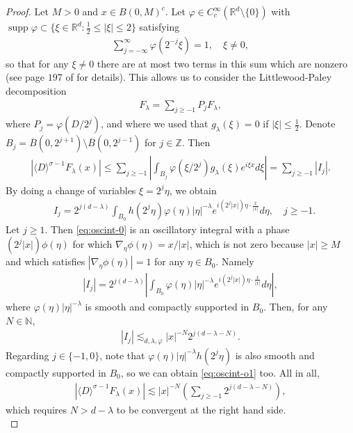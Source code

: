 \documentclass[a4paper, reqno, 11pt]{amsart}
\theoremstyle{definition}
\DeclareMathOperator\supp{supp}
\begin{document}
\begin{proof}
Let $M > 0$ and $x \in B(0,M)^c$. Let $\varphi \in C^{\infty}_c(\mathbb{R}^d\setminus \{0\})$ with $\supp \varphi \subset \{\xi \in \mathbb{R}^d : \frac{1}{2} \leq |\xi| \leq 2\}$ satisfying
\begin{align*}
\sum_{j = -\infty}^{\infty} \varphi(2^{-j}\xi) = 1, \quad \xi \neq 0,
\end{align*}
so that for any $\xi \neq 0$ there are at most two terms in this sum which are nonzero (see page $197$ of \cite{MS1} for details). This allows us to consider the Littlewood-Paley decomposition
\begin{align}
			F_{\lambda} = \sum_{j \geq -1} P_{j}F_{\lambda},
			\label{eq:lp-decomp}
		\end{align}
		where $P_j = \varphi(D/2^j)$, and where we used that $g_{\lambda}(\xi) = 0$ if $|\xi| \leq \frac{1}{2}$. Denote $B_j = \overline{B}(0,2^{j+1}) \setminus \overline{B}(0,2^{j-1})$ for $j \in \mathbb{Z}$. Then
\begin{align*}
|\langle D \rangle^{\sigma-1} F_{\lambda}(x)| \leq \sum_{j \geq -1} \left| \int_{B_j} \varphi(\xi/2^j) g_{\lambda}(\xi) e^{i\xi x} d\xi \right| = \sum_{j\geq -1} |I_j|.
\end{align*}
By doing a change of variables $\xi = 2^j \eta$, we obtain
\begin{align}\label{eq:oscint-0}
&I_j = 2^{j(d - \lambda)} \int_{B_0} h(2^j \eta) \varphi(\eta) |\eta|^{-\lambda} e^{i(2^j |x|) \eta \cdot \frac{x}{|x|}} d\eta, \quad j \geq -1.
\end{align}
Let $j \geq 1$. Then \eqref{eq:oscint-0} is an oscillatory integral with a phase $(2^j |x|)\phi(\eta)$ for which $\nabla_{\eta} \phi(\eta) = x/|x|$, which is not zero because $|x| \geq M$ and which satisfies $|\nabla_{\eta}\phi(\eta)| = 1$ for any $\eta \in B_0$. Namely
\begin{align}\label{eq:oscint-o1}
|I_j| = 2^{j(d - \lambda)} \left| \int_{B_0} \varphi(\eta) |\eta|^{-\lambda} e^{i(2^j |x|) \eta \cdot \frac{x}{|x|}} d\eta \right|,
\end{align}
where $\varphi(\eta)|\eta|^{-\lambda}$ is smooth and compactly supported in $B_0$. Then, for any $N \in \mathbb{N}$,
\begin{align*}
|I_j| \lesssim_{d,\lambda,\varphi} |x|^{-N} 2^{j(d - \lambda - N)}.
\end{align*}
Regarding $j \in \{-1,0\}$, note that $\varphi(\eta) |\eta|^{-\lambda} h(2^j \eta)$ is also smooth and compactly supported in $B_0$, so we can obtain \eqref{eq:oscint-o1} too. All in all,
\begin{align}\label{eq:nonstatphase-oscint}
|\langle D \rangle^{\sigma-1} F_{\lambda}(x)| \lesssim |x|^{-N} \left( \sum_{j \geq -1} 2^{j(d-\lambda-N)} \right),
\end{align}
which requires $N > d - \lambda$ to be convergent at the right hand side. \\


\end{proof}
\end{document}
